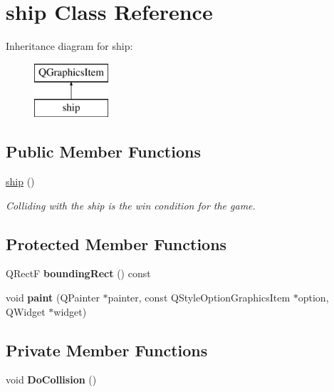 \hypertarget{classship}{\section{ship Class Reference}
\label{classship}
}
Inheritance diagram for ship\-:\begin{figure}[H]
\begin{center}
\leavevmode
\includegraphics[height=2.000000cm]{classship}
\end{center}
\end{figure}
\subsection*{Public Member Functions}
\begin{DoxyCompactItemize}
\item 
\hypertarget{classship_a002c8f2eea35e3b4f0c8003850a782d4}{\hyperlink{classship_a002c8f2eea35e3b4f0c8003850a782d4}{ship} ()}\label{classship_a002c8f2eea35e3b4f0c8003850a782d4}

\begin{DoxyCompactList}\small\item\em Colliding with the ship is the win condition for the game. \end{DoxyCompactList}\end{DoxyCompactItemize}
\subsection*{Protected Member Functions}
\begin{DoxyCompactItemize}
\item 
\hypertarget{classship_a4941ffe7e91c54d95aec7fcd32e1bc2f}{Q\-Rect\-F {\bfseries bounding\-Rect} () const }\label{classship_a4941ffe7e91c54d95aec7fcd32e1bc2f}

\item 
\hypertarget{classship_a07a6cb76b7b3b96ac3617fc12cdc786a}{void {\bfseries paint} (Q\-Painter $\ast$painter, const Q\-Style\-Option\-Graphics\-Item $\ast$option, Q\-Widget $\ast$widget)}\label{classship_a07a6cb76b7b3b96ac3617fc12cdc786a}

\end{DoxyCompactItemize}
\subsection*{Private Member Functions}
\begin{DoxyCompactItemize}
\item 
\hypertarget{classship_ab9d36b37f61a759bd8fa62cb12d7de2d}{void {\bfseries Do\-Collision} ()}\label{classship_ab9d36b37f61a759bd8fa62cb12d7de2d}

\end{DoxyCompactItemize}

